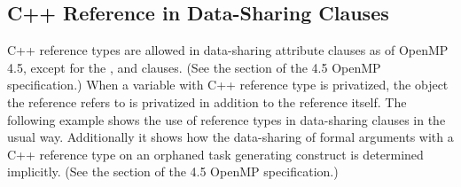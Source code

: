 \begin{cppspecific}[4ex]
\section{C++ Reference in Data-Sharing Clauses}
\label{sec:cpp_reference}

C++ reference types are allowed in data-sharing attribute clauses as of OpenMP 4.5, except
for the ,  and  clauses.  
(See the  section of the 4.5 OpenMP specification.)
When a variable with C++ reference type is privatized, the object the reference refers to is privatized in addition to the reference itself.
The following example shows the use of reference types in data-sharing clauses in the usual way.
Additionally it shows how the data-sharing of formal arguments with a C++ reference type on an orphaned task generating construct is determined implicitly. (See the  section of the 4.5 OpenMP specification.)


\end{cppspecific}
